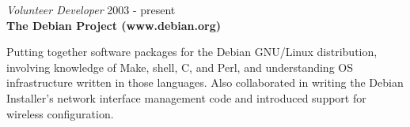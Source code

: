 \documentclass[overlapped,line,margin]{res}
\begin{document}
\begin{resume}
{\sl Volunteer Developer} \hfill 2003 - present \\
\textbf{The Debian Project (www.debian.org)}

  Putting together software packages for the Debian GNU/Linux distribution,
  involving knowledge of Make, shell, C, and Perl, and understanding OS
  infrastructure written in those languages. Also collaborated in writing the
  Debian Installer's network interface management code and introduced support
  for wireless configuration.

\end{resume}
\end{document}
